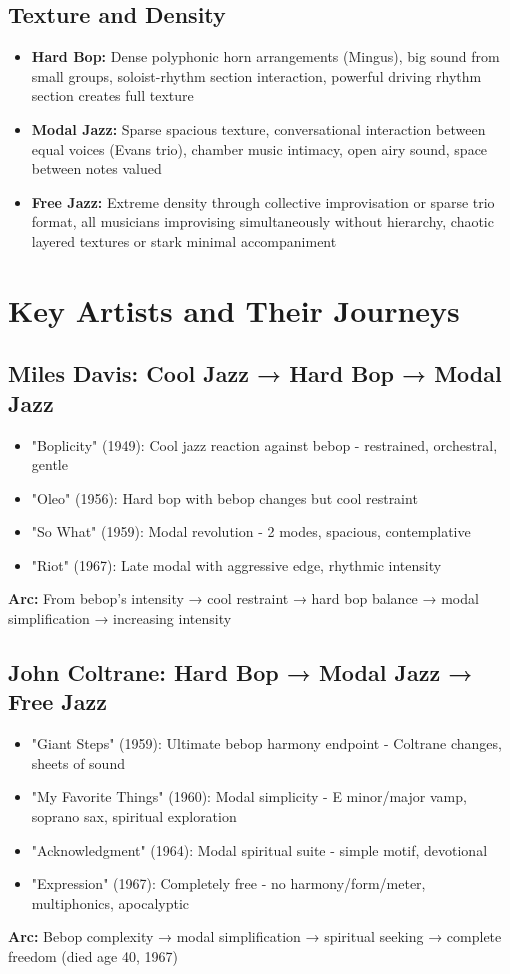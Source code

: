 \documentclass[11pt]{article}
\begin{document}
\subsection*{Texture and Density}
\begin{itemize}[leftmargin=*, itemsep=0.2em]
\item \textbf{Hard Bop:} Dense polyphonic horn arrangements (Mingus), big sound from small groups, soloist-rhythm section interaction, powerful driving rhythm section creates full texture
\item \textbf{Modal Jazz:} Sparse spacious texture, conversational interaction between equal voices (Evans trio), chamber music intimacy, open airy sound, space between notes valued
\item \textbf{Free Jazz:} Extreme density through collective improvisation or sparse trio format, all musicians improvising simultaneously without hierarchy, chaotic layered textures or stark minimal accompaniment
\end{itemize}

\section*{Key Artists and Their Journeys}

\subsection*{Miles Davis: Cool Jazz → Hard Bop → Modal Jazz}
\begin{itemize}[leftmargin=*, itemsep=0.2em]
\item "Boplicity" (1949): Cool jazz reaction against bebop - restrained, orchestral, gentle
\item "Oleo" (1956): Hard bop with bebop changes but cool restraint
\item "So What" (1959): Modal revolution - 2 modes, spacious, contemplative
\item "Riot" (1967): Late modal with aggressive edge, rhythmic intensity
\end{itemize}
\textbf{Arc:} From bebop's intensity → cool restraint → hard bop balance → modal simplification → increasing intensity

\subsection*{John Coltrane: Hard Bop → Modal Jazz → Free Jazz}
\begin{itemize}[leftmargin=*, itemsep=0.2em]
\item "Giant Steps" (1959): Ultimate bebop harmony endpoint - Coltrane changes, sheets of sound
\item "My Favorite Things" (1960): Modal simplicity - E minor/major vamp, soprano sax, spiritual exploration
\item "Acknowledgment" (1964): Modal spiritual suite - simple motif, devotional
\item "Expression" (1967): Completely free - no harmony/form/meter, multiphonics, apocalyptic
\end{itemize}
\textbf{Arc:} Bebop complexity → modal simplification → spiritual seeking → complete freedom (died age 40, 1967)
\end{document}
